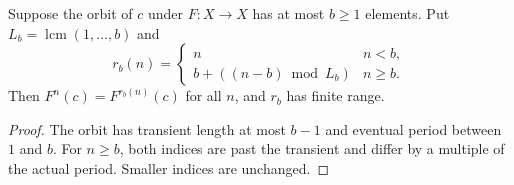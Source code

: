 \begin{lemma}
Suppose the orbit of \(c\) under \(F:X\to X\) has at most \(b\ge1\)
elements. Put \(L_b=\operatorname{lcm}(1,\ldots,b)\) and
\[
 r_b(n)=
 \begin{cases}
 n&n<b,\\
 b+((n-b)\bmod L_b)&n\ge b.
 \end{cases}
\]
Then \(F^n(c)=F^{r_b(n)}(c)\) for all \(n\), and \(r_b\) has finite range.
\end{lemma}
\begin{proof}
The orbit has transient length at most \(b-1\) and eventual period
between \(1\) and \(b\). For \(n\ge b\), both indices are past the
transient and differ by a multiple of the actual period. Smaller
indices are unchanged.
\end{proof}

